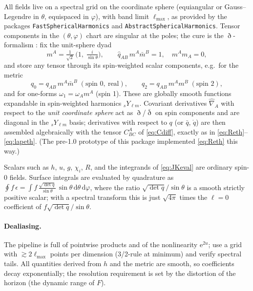 \documentclass[11pt]{article}
\newcommand{\dd}{\mathrm{d}}
\newcommand{\ee}{\mathrm{e}}
\newcommand{\qo}{\mathring{q}}          %
\newcommand{\bareth}{\bar{\eth}}   %
\begin{document}
All fields live on a spectral grid on the coordinate sphere (equiangular or
Gauss--Legendre in $\theta$, equispaced in $\varphi$), with band limit
$\ell_{\max}$, as provided by the packages \texttt{FastSphericalHarmonics}
and \texttt{Abstract\-Spherical\-Harmonics}.  Tensor components in the
$(\theta,\varphi)$ chart are singular at the poles; the cure is the
$\eth$-formalism \cite{gomez1997}: fix the unit-sphere dyad
\begin{equation}
  m^A = \tfrac{1}{\sqrt2}\,\bigl(1,\; \tfrac{i}{\sin\theta}\bigr),
  \qquad
  \hat q_{AB}\,m^A\bar m^B = 1,\quad m^Am_A = 0,
\end{equation}
and store any tensor through its spin-weighted scalar components, e.g.\ for
the metric
\begin{equation}
  q_0 = q_{AB}\,m^A\bar m^B \;(\text{spin } 0,\ \text{real}),
  \qquad
  q_2 = q_{AB}\,m^A m^B \;(\text{spin } 2),
\end{equation}
and for one-forms $\omega_1 = \omega_A m^A$ (spin 1).  These are globally
smooth functions expandable in spin-weighted harmonics ${}_sY_{\ell m}$.
Covariant derivatives $\hat\nabla_A$ with respect to the \emph{unit
coordinate sphere} act as $\eth$/$\bareth$ on spin components and are
diagonal in the ${}_sY_{\ell m}$ basis; derivatives with respect to $q$ (or
$\bar q$, $\qo$) are then assembled algebraically with the tensor
$C^A_{BC}$ of \eqref{eq:Cdiff}, exactly as in
\eqref{eq:Reth}--\eqref{eq:lapeth}.  (The pre-1.0 prototype of this
package implemented \eqref{eq:Reth} this way.)

Scalars such as $h$, $u$, $g$, $\chi_i$, $R$, and the integrands of
\eqref{eq:JKeval} are ordinary spin-0 fields.  Surface integrals are
evaluated by quadrature as
$\oint f\,\epsilon = \int f\,\frac{\sqrt{\det q}}{\sin\theta}\,
\sin\theta\,\dd\theta\,\dd\varphi$, where the ratio
$\sqrt{\det q}/\sin\theta$ is a smooth strictly positive scalar; with a
spectral transform this is just $\sqrt{4\pi}$ times the $\ell=0$ coefficient
of $f\sqrt{\det q}/\sin\theta$.

\paragraph{Dealiasing.}  The pipeline is full of pointwise products and of
the nonlinearity $\ee^{2u}$; use a grid with $\gtrsim 2\ell_{\max}$ points
per dimension (3/2-rule at minimum) and verify spectral tails.  All
quantities derived from $h$ and the metric are smooth, so coefficients decay
exponentially; the resolution requirement is set by the distortion of the
horizon (the dynamic range of $F$).
\end{document}
